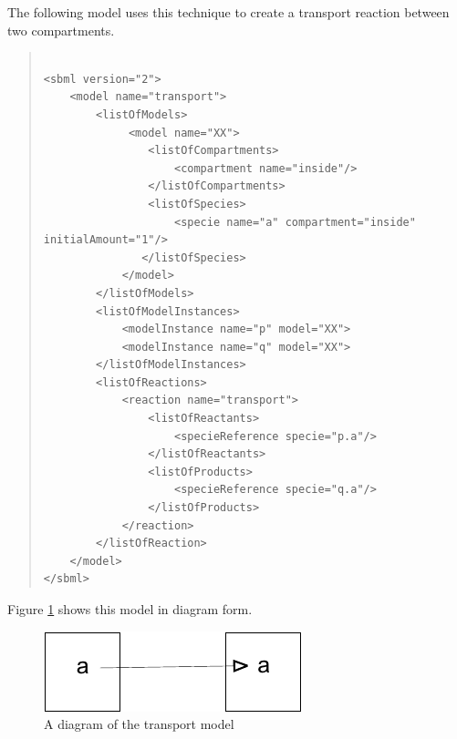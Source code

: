 \documentclass[10pt]{article}
\newcommand{\tightspacing}{\renewcommand{\baselinestretch}{0.85}}
\newcommand{\regularspacing}{\renewcommand{\baselinestretch}{1.0}}
\begin{document}
The following model uses this technique to create a
transport reaction between two compartments.


\begin{quote}

  \begin{small}

    \tightspacing

\begin{verbatim}

<sbml version="2">
    <model name="transport">
        <listOfModels>
             <model name="XX">
                <listOfCompartments>
                    <compartment name="inside"/>
                </listOfCompartments>
                <listOfSpecies>
                    <specie name="a" compartment="inside" initialAmount="1"/>
               </listOfSpecies>
            </model>
        </listOfModels>
        <listOfModelInstances>
            <modelInstance name="p" model="XX">
            <modelInstance name="q" model="XX">
        </listOfModelInstances>
        <listOfReactions>
            <reaction name="transport">
                <listOfReactants>
                    <specieReference specie="p.a"/>
                </listOfReactants>
                <listOfProducts>
                    <specieReference specie="q.a"/>
                </listOfProducts>
            </reaction>
        </listOfReaction>
    </model>
</sbml>

\end{verbatim}

    \regularspacing

  \end{small}

\end{quote}

Figure \ref{fig:transport} shows this model in diagram form.

\begin{figure}

  \centering

  \includegraphics[scale = 0.75]{transport}

  \caption{A diagram of the transport model}

  \label{fig:transport}

\end{figure}
\end{document}
